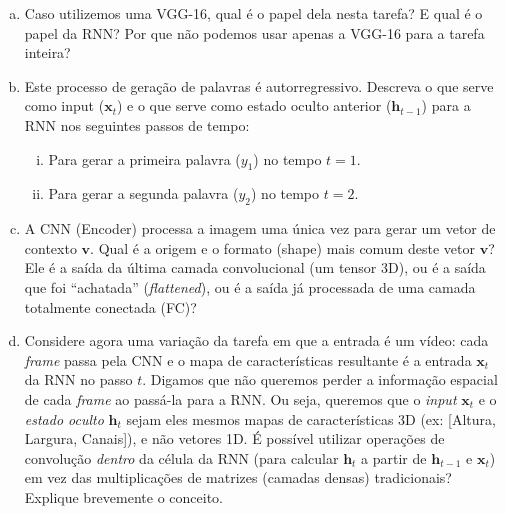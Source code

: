 \documentclass{dlproblemset}
\begin{document}
\begin{enumerate}[I)]
        \begin{enumerate}[a)]
            \item Caso utilizemos uma VGG-16, qual é o papel dela nesta tarefa? E qual é o papel da RNN? Por que não podemos usar apenas a VGG-16 para a tarefa inteira?
            
            
            \item Este processo de geração de palavras é autorregressivo. Descreva o que serve como input ($\mathbf{x}_t$) e o que serve como estado oculto anterior ($\mathbf{h}_{t-1}$) para a RNN nos seguintes passos de tempo:
                \begin{enumerate}[i.)]
                    \item Para gerar a primeira palavra ($y_1$) no tempo $t=1$.
                    \item Para gerar a segunda palavra ($y_2$) no tempo $t=2$.
                \end{enumerate}
            
            \item A CNN (Encoder) processa a imagem uma única vez para gerar um vetor de contexto $\mathbf{v}$. Qual é a origem e o formato (shape) mais comum deste vetor $\mathbf{v}$? Ele é a saída da última camada convolucional (um tensor 3D), ou é a saída que foi ``achatada'' (\textit{flattened}), ou é a saída já processada de uma camada totalmente conectada (FC)?

            \item Considere agora uma variação da tarefa em que a entrada é um vídeo: cada \textit{frame} passa pela CNN e o mapa de características resultante é a entrada $\mathbf{x}_t$ da RNN no passo $t$. Digamos que não queremos perder a informação espacial de cada \textit{frame} ao passá-la para a RNN. Ou seja, queremos que o \textit{input} $\mathbf{x}_t$ e o \textit{estado oculto} $\mathbf{h}_t$ sejam eles mesmos mapas de características 3D (ex: [Altura, Largura, Canais]), e não vetores 1D. É possível utilizar operações de convolução \emph{dentro} da célula da RNN (para calcular $\mathbf{h}_t$ a partir de $\mathbf{h}_{t-1}$ e $\mathbf{x}_t$) em vez das multiplicações de matrizes (camadas densas) tradicionais? Explique brevemente o conceito.
        \end{enumerate}


\end{enumerate}
\end{document}
